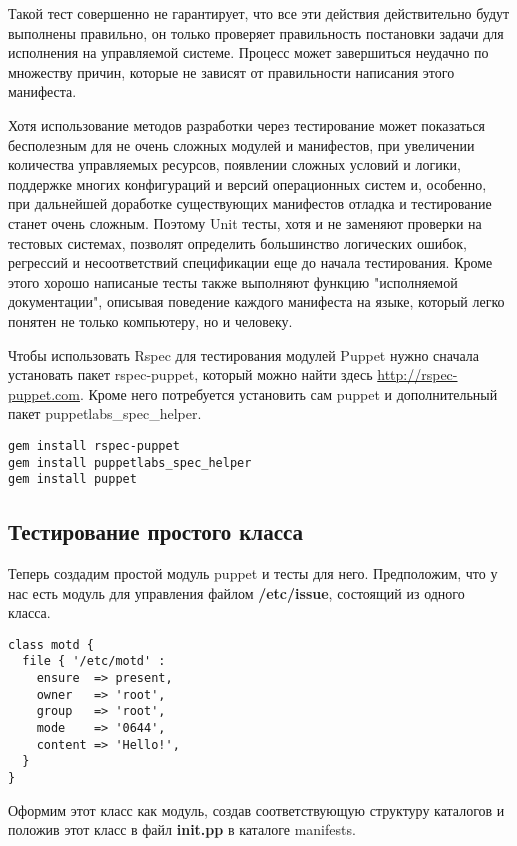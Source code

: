 Такой тест совершенно не гарантирует, что все эти действия действительно будут выполнены правильно, он только проверяет правильность постановки задачи для исполнения на управляемой системе. Процесс может завершиться неудачно по множеству причин, которые не зависят от правильности написания этого манифеста.

Хотя использование методов разработки через тестирование может показаться бесполезным для не очень сложных модулей и манифестов, при увеличении количества управляемых ресурсов, появлении сложных условий и логики, поддержке многих конфигураций и версий операционных систем и, особенно, при дальнейшей доработке существующих манифестов отладка и тестирование станет очень сложным. Поэтому Unit тесты, хотя и не заменяют проверки на тестовых системах, позволят определить большинство логических ошибок, регрессий и несоответствий спецификации еще до начала тестирования. Кроме этого хорошо написаные тесты также выполняют функцию "исполняемой документации", описывая поведение каждого манифеста на языке, который легко понятен не только компьютеру, но и человеку.

Чтобы использовать Rspec для тестирования модулей Puppet нужно сначала установать пакет rspec-puppet, который можно найти здесь \url{http://rspec-puppet.com}. Кроме него потребуется установить сам puppet и дополнительный пакет puppetlabs\_spec\_helper.

\begin{verbatim}
gem install rspec-puppet
gem install puppetlabs_spec_helper
gem install puppet
\end{verbatim}

\subsection{Тестирование простого класса}

Теперь создадим простой модуль puppet и тесты для него. Предположим, что у нас есть модуль для управления файлом \textbf{/etc/issue}, состоящий из одного класса.

\begin{lstlisting}
class motd {
  file { '/etc/motd' :
    ensure  => present,
    owner   => 'root',
    group   => 'root',
    mode    => '0644',
    content => 'Hello!',
  }
}
\end{lstlisting}

Оформим этот класс как модуль, создав соответствующую структуру каталогов и положив этот класс в файл \textbf{init.pp} в каталоге manifests.

